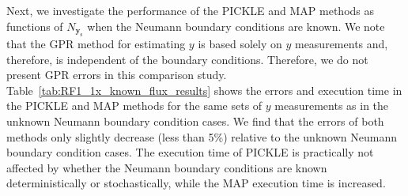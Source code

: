 \documentclass{agujournal2019}
\renewcommand{\caption}[2][]{\ignorespaces}
\begin{document}
\begin{comment}
\begin{table}[!htbp]
    \centering
    \caption{Performance of PICKLE and MAP for the RF1 field with $N_{FV}=1475$ and known Neumann boundary conditions. 1000 KL terms are used in the CKLEs of $y$ and $u$.}
    \label{tab:low_res_known_flux_results}
    \begin{tabu} to \textwidth {*{2}{r}*{6}{X[cm]}}
        \toprule
        & & \multicolumn{6}{c}{$N_{\mathbf{y}_{\mathrm{s}}}$} \\
        & solver & 600 & 400 & 200 & 100 & 50 & 25 \\
        \midrule
        \multirow{2}{*}{\shortstack[r]{least square\\iterations}} & PICKLE & 14 & 23 & 14 & 18 & 23 & 28 \\
        & MAP & 105 & 41 & 26 & 29 & 44 & 73 \\
        \midrule
        \multirow{2}{*}{\shortstack[r]{execution\\time (s)}} & PICKLE & 175.97 & 272.93 & 161.59 & 194.42 & 239.63 & 272.54 \\
        & MAP & 520.61 & 167.58 & 121.25 & 121.01 & 184.31 & 315.83 \\
        \midrule
        \multirow{2}{*}{\shortstack[r]{relative\\$\ell_2$ error}} & PICKLE & 0.23 & 0.28 & 0.33 & 0.42 & 0.49 & 0.99 \\
        & MAP & 0.19 & 0.23 & 0.29 & 0.33 & 0.42 & 0.43 \\
        \midrule
        \multirow{2}{*}{\shortstack[r]{absolute\\$\ell_\infty$ error}} &  PICKLE & 3.35 & 4.45 & 4.55 & 4.46 & 5.32 & 6.84 \\
        & MAP & 3.99 & 4.30 & 4.22 & 4.32 & 6.55 & 6.43 \\
        \bottomrule
    \end{tabu}
\end{table}
\end{comment}

Next, we investigate the performance of the PICKLE and MAP methods as functions of $N_{\mathbf{y}_{\mathrm{s}}}$ when the Neumann boundary conditions are known.
We note that the GPR method for estimating $y$ is based solely on $y$ measurements and, therefore, is independent of the boundary conditions. Therefore, we do not present GPR errors in this comparison study.  
Table~\ref{tab:RF1_1x_known_flux_results} shows the errors and execution time in the PICKLE and MAP methods for the same sets of $y$ measurements as in the unknown Neumann boundary condition cases.
We find that the errors of both methods only slightly decrease (less than 5\%) relative to the unknown Neumann boundary condition cases. 
The execution time of PICKLE is practically not affected by whether the Neumann boundary conditions are known deterministically or stochastically, while the MAP execution time is increased.
\end{document}
